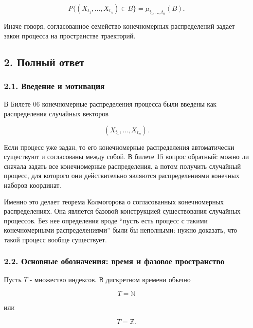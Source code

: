 \documentclass[
  11pt,
  a4paper,
]{article}
\begin{document}
\[
P\{(X_{t_1},\ldots,X_{t_n})\in B\}
=
\mu_{t_1,\ldots,t_n}(B).
\]

Иначе говоря, согласованное семейство конечномерных распределений задает
закон процесса на пространстве траекторий.

\subsection{2. Полный
ответ}\label{ux43fux43eux43bux43dux44bux439-ux43eux442ux432ux435ux442}

\subsubsection{2.1. Введение и
мотивация}\label{ux432ux432ux435ux434ux435ux43dux438ux435-ux438-ux43cux43eux442ux438ux432ux430ux446ux438ux44f}

В Билете 06 конечномерные распределения процесса были введены как
распределения случайных векторов

\[
(X_{t_1},\ldots,X_{t_n}).
\]

Если процесс уже задан, то его конечномерные распределения автоматически
существуют и согласованы между собой. В билете 15 вопрос обратный: можно
ли сначала задать все конечномерные распределения, а потом получить
случайный процесс, для которого они действительно являются
распределениями конечных наборов координат.

Именно это делает теорема Колмогорова о согласованных конечномерных
распределениях. Она является базовой конструкцией существования
случайных процессов. Без нее определения вроде ``пусть есть процесс с
такими конечномерными распределениями'' были бы неполными: нужно
доказать, что такой процесс вообще существует.

\subsubsection{2.2. Основные обозначения: время и фазовое
пространство}\label{ux43eux441ux43dux43eux432ux43dux44bux435-ux43eux431ux43eux437ux43dux430ux447ux435ux43dux438ux44f-ux432ux440ux435ux43cux44f-ux438-ux444ux430ux437ux43eux432ux43eux435-ux43fux440ux43eux441ux442ux440ux430ux43dux441ux442ux432ux43e}

Пусть \(T\) - множество индексов. В дискретном времени обычно

\[
T=\mathbb N
\]

или

\[
T=\mathbb Z.
\]
\end{document}
